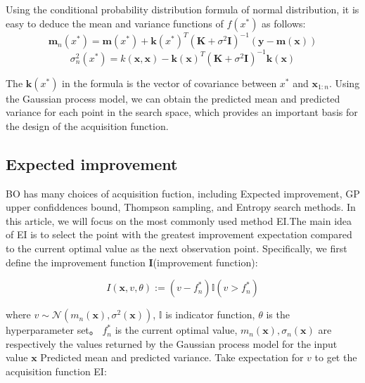 \documentclass{article}
\begin{document}
\hspace*{\fill}

Using the conditional probability distribution formula of normal distribution, it is easy to deduce the mean and variance functions of $f(x^*)$ as follows:
\begin{equation}\label{eq4}
\textbf{m}_n(x^*)=\textbf{m}(x^*)+\textbf{k}(x^*)^T(\textbf{K}+\sigma^2\textbf{I})^{-1}(\textbf{y}-\textbf{m}(\textbf{x}))
\end{equation}
\begin{equation}\label{eq5}
\sigma^2_n(x^*)=k(\textbf{x},\textbf{x})-\textbf{k}(\textbf{x})^T(\textbf{K}+\sigma^2\textbf{I})^{-1} \textbf{k}(\textbf{x})
\end{equation}

The $\textbf{k}(x^*)$ in the formula is the vector of covariance between $x^*$ and $\textbf{x}_{1:n}$.
Using the Gaussian process model, we can obtain the predicted mean and predicted variance for each point in the search space, which provides an important basis for the design of the acquisition function.

\subsection{Expected improvement}
\hspace{2em}BO has many choices of acquisition fuction, including Expected improvement\citep{Jones1998Efficient}, GP upper confiddences bound\citep{Srinivas2009Gaussian}, Thompson sampling\citep{Thompson1933On}, and Entropy search methods\citep{Hennig2012Entropy}. In this article, we will focus on the most commonly used method EI.The main idea of EI is to select the point with the greatest improvement expectation compared to the current optimal value as the next observation point. Specifically, we first define the improvement function $\textbf{I}$(improvement function):

\begin{equation}\label{eq6}
	\textit{I}(\textbf{x},v,\theta):=(v-f^*_n)\mathbb{I}(v>f^*_n)
\end{equation}

where $v\sim \mathcal{N}(m_n(\textbf{x}),\sigma^2(\textbf{x}))$, $\mathbb{I}$ is indicator function, $\theta$ is the hyperparameter set。
$f^*_n$ is the current optimal value, $m_n(\textbf{x}),\sigma_n(\textbf{x})$ are respectively the values returned by the Gaussian process model for the input value $\textbf{x}$ Predicted mean and predicted variance.
Take expectation for $v$ to get the acquisition function EI:
\end{document}
